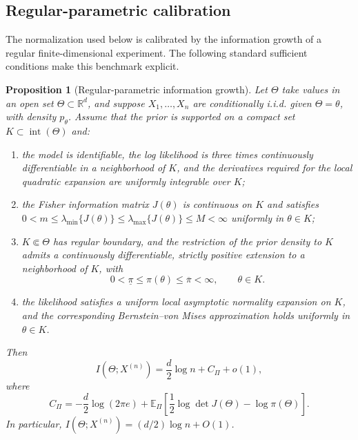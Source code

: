 \documentclass[11pt]{article}
\theoremstyle{plain}
\newtheorem{proposition}{Proposition}
\theoremstyle{definition}
\theoremstyle{remark}
\newcommand{\E}{\mathbb{E}}
\begin{document}
\subsection{Regular-parametric calibration}
\label{subsec:calibration}

The normalization used below is calibrated by the information growth of a regular finite-dimensional experiment. The following standard sufficient conditions make this benchmark explicit.

\begin{proposition}[Regular-parametric information growth]
	\label{prop:regular-calibration}
	Let $\Theta$ take values in an open set $\mathsf{\Theta}\subset\mathbb R^d$, and suppose $X_1,\ldots,X_n$ are conditionally i.i.d. given $\Theta=\theta$, with density $p_\theta$. Assume that the prior is supported on a compact set $K\subset\operatorname{int}(\mathsf{\Theta})$ and:
	
	\begin{enumerate}
		\item[(A1)] the model is identifiable, the log likelihood is three times continuously differentiable in a neighborhood of $K$, and the derivatives required for the local quadratic expansion are uniformly integrable over $K$;
		
		\item[(A2)] the Fisher information matrix $J(\theta)$ is continuous on $K$ and satisfies $0<m\leq\lambda_{\min}\{J(\theta)\}\leq\lambda_{\max}\{J(\theta)\}\leq M<\infty$ uniformly in $\theta\in K$;
		
		\item[(A3)] \(K\Subset\mathsf{\Theta}\) has regular boundary, and the restriction of the prior density to \(K\) admits a continuously differentiable, strictly positive extension to a neighborhood of \(K\), with
		\[
		0<\underline\pi\leq\pi(\theta)\leq\overline\pi<\infty,
		\qquad \theta\in K.
		\]
			
		\item[(A4)] the likelihood satisfies a uniform local asymptotic normality expansion on $K$, and the corresponding Bernstein--von Mises approximation holds uniformly in $\theta\in K$.
	\end{enumerate}
	
	Then
	\begin{equation}
		\label{eq:regular-mi-expansion}
		I(\Theta;X^{(n)})
		=
		\frac d2\log n+C_\Pi+o(1),
	\end{equation}
	where
	\[
	C_\Pi
	=
	-\frac d2\log(2\pi e)
	+
	\E_\Pi\!\left[
	\frac12\log\det J(\Theta)-\log\pi(\Theta)
	\right].
	\]
	In particular, $I(\Theta;X^{(n)})=(d/2)\log n+O(1)$.
\end{proposition}
\end{document}
